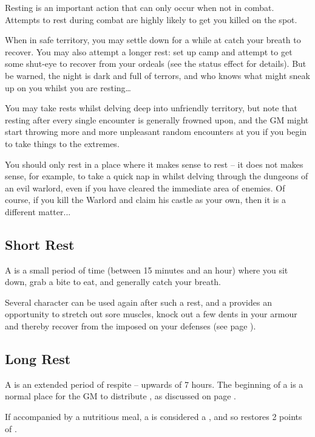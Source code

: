 Resting is an important action that can only occur when not in combat. Attempts to rest during combat are highly likely to get you killed on the spot. 

When in safe territory, you may settle down for a while at catch your breath to recover. You may also attempt a longer rest: set up camp and attempt to get some shut-eye to recover from your ordeals (see the  status effect for details). But be warned, the night is dark and full of terrors, and who knows what might sneak up on you whilst you are resting…

You may take rests whilst delving deep into unfriendly territory, but note that resting after every single encounter is generally frowned upon, and the GM might start throwing more and more unpleasant random encounters at you if you begin to take things to the extremes. 

You should only rest in a place where it makes sense to rest – it does not makes sense, for example, to take a quick nap in whilst delving through the dungeons of an evil warlord, even if you have cleared the immediate area of enemies. Of course, if you kill the Warlord and claim his castle as your own, then it is a different matter...

\subsection{Short Rest}

A  is a small period of time (between 15 minutes and an hour) where you sit down, grab a bite to eat, and generally catch your breath. 

Several character  can be used again after such a rest, and a  provides an opportunity to stretch out sore muscles, knock out a few dents in your armour and thereby recover from the  imposed on your defenses (see page \pageref{S:Defence}).

\subsection{Long Rest}

A  is an extended period of respite -- upwards of 7 hours. The beginning of a  is a normal place for the GM to distribute , as discussed on page \pageref{S:Progression}.

If accompanied by a nutritious meal, a  is considered a , and so restores 2 points of . 

